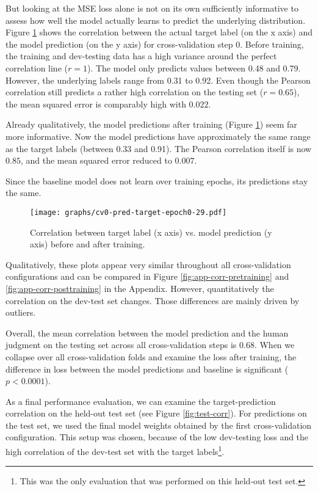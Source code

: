 \documentclass[11pt,a4paper]{article}
\begin{document}
But looking at the MSE loss alone is not on its own sufficiently informative to assess how well the model actually learns to predict the underlying distribution. Figure \ref{fig:corr-cv0} shows the correlation between the actual target label (on the x axis) and the model prediction (on the y axis) for cross-validation step 0. Before training, the training and dev-testing data has a high variance around the perfect correlation line ($r=1$). The model only predicts values between 0.48 and 0.79. However, the underlying labels range from 0.31 to 0.92. Even though the Pearson correlation still predicts a rather high correlation on the testing set ($r=0.65$), the mean squared error is comparably high with $0.022$. 

Already qualitatively, the model predictions after training (Figure \ref{fig:corr-cv0}) seem far more informative. Now the model predictions have approximately the same range as the target labels (between 0.33 and 0.91). The Pearson correlation itself is now $0.85$, and the mean squared error reduced to $0.007$.

Since the baseline model does not learn over training epochs, its predictions stay the same.

\begin{figure}
	\texttt{[image: graphs/cv0-pred-target-epoch0-29.pdf]}
	\caption{Correlation between target label (x axis) vs. model prediction (y axis) before and after training.}
	\label{fig:corr-cv0}
\end{figure}

Qualitatively, these plots appear very similar throughout all cross-validation configurations and can be compared in Figure \ref{fig:app-corr-pretraining} and \ref{fig:app-corr-posttraining} in the Appendix. However, quantitatively the correlation on the dev-test set changes. Those differences are mainly driven by outliers.

Overall, the mean correlation between the model prediction and the human judgment on the testing set across all cross-validation steps is $0.68$. When we collapse over all cross-validation folds and examine the loss after training, the difference in loss between the model predictions and baseline is significant ($p<0.0001$).

\label{model-results}

As a final performance evaluation, we can examine the target-prediction correlation on the held-out test set (see Figure \ref{fig:test-corr}). For predictions on the test set, we used the final model weights obtained by the first cross-validation configuration. This setup was chosen, because of the low dev-testing loss and the high correlation of the dev-test set with the target labels\footnote{This was the only evaluation that was performed on this held-out test set.}. 
\end{document}
